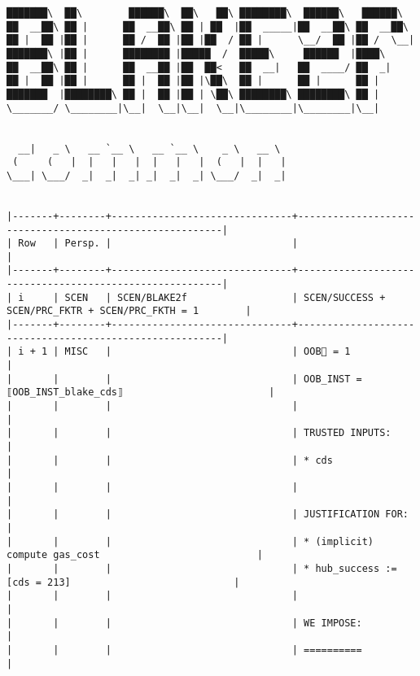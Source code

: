 \documentclass[varwidth=\maxdimen,margin=0.5cm,multi={verbatim}]{standalone}
\begin{document}
\begin{verbatim}
███████\  ██\        ██████\  ██\   ██\ ████████\  ██████\   ██████\
██  __██\ ██ |      ██  __██\ ██ | ██  |██  _____|██  __██\ ██  __██\
██ |  ██ |██ |      ██ /  ██ |██ |██  / ██ |      \__/  ██ |██ /  \__|
███████\ |██ |      ████████ |█████  /  █████\     ██████  |████\
██  __██\ ██ |      ██  __██ |██  ██<   ██  __|   ██  ____/ ██  _|
██ |  ██ |██ |      ██ |  ██ |██ |\██\  ██ |      ██ |      ██ |
███████  |████████\ ██ |  ██ |██ | \██\ ████████\ ████████\ ██ |
\_______/ \________|\__|  \__|\__|  \__|\________|\________|\__|


  __|   _ \   __ `__ \   __ `__ \    _ \   __ \
 (     (   |  |   |   |  |   |   |  (   |  |   |
\___| \___/  _|  _|  _| _|  _|  _| \___/  _|  _|


|-------+--------+-------------------------------+---------------------------------------------------------|
| Row   | Persp. |                               |                                                         |
|-------+--------+-------------------------------+---------------------------------------------------------|
| i     | SCEN   | SCEN/BLAKE2f                  | SCEN/SUCCESS + SCEN/PRC_FKTR + SCEN/PRC_FKTH = 1        |
|-------+--------+-------------------------------+---------------------------------------------------------|
| i + 1 | MISC   |                               | OOB🏴 = 1                                               |
|       |        |                               | OOB_INST = ⟦OOB_INST_blake_cds⟧                         |
|       |        |                               |                                                         |
|       |        |                               | TRUSTED INPUTS:                                         |
|       |        |                               | * cds                                                   |
|       |        |                               |                                                         |
|       |        |                               | JUSTIFICATION FOR:                                      |
|       |        |                               | * (implicit) compute gas_cost                           |
|       |        |                               | * hub_success := [cds = 213]                            |
|       |        |                               |                                                         |
|       |        |                               | WE IMPOSE:                                              |
|       |        |                               | ==========                                              |

\end{verbatim}
\end{document}
